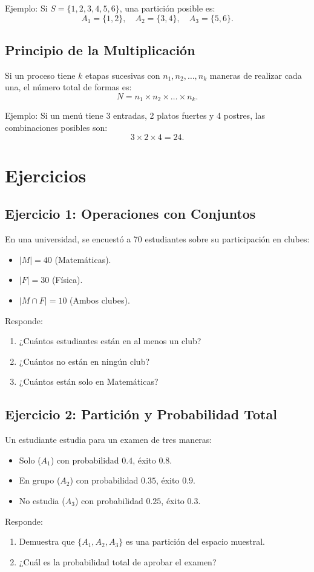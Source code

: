 \documentclass{article}
\begin{document}
	Ejemplo: Si $S = \{1,2,3,4,5,6\}$, una partición posible es:
	\[ A_1 = \{1,2\}, \quad A_2 = \{3,4\}, \quad A_3 = \{5,6\}. \]
	
	\subsection{Principio de la Multiplicación}
	Si un proceso tiene $k$ etapas sucesivas con $n_1, n_2, \dots, n_k$ maneras de realizar cada una, el número total de formas es:
	\[ N = n_1 \times n_2 \times \dots \times n_k. \]
	
	Ejemplo: Si un menú tiene 3 entradas, 2 platos fuertes y 4 postres, las combinaciones posibles son:
	\[ 3 \times 2 \times 4 = 24. \]
	
	\section{Ejercicios}
	
	\subsection{Ejercicio 1: Operaciones con Conjuntos}
	En una universidad, se encuestó a 70 estudiantes sobre su participación en clubes:
	\begin{itemize}
		\item $|M| = 40$ (Matemáticas).
		\item $|F| = 30$ (Física).
		\item $|M \cap F| = 10$ (Ambos clubes).
	\end{itemize}
	Responde:
	\begin{enumerate}
		\item ¿Cuántos estudiantes están en al menos un club?
		\item ¿Cuántos no están en ningún club?
		\item ¿Cuántos están solo en Matemáticas?
	\end{enumerate}
	
	\subsection{Ejercicio 2: Partición y Probabilidad Total}
	Un estudiante estudia para un examen de tres maneras:
	\begin{itemize}
		\item Solo ($A_1$) con probabilidad $0.4$, éxito $0.8$.
		\item En grupo ($A_2$) con probabilidad $0.35$, éxito $0.9$.
		\item No estudia ($A_3$) con probabilidad $0.25$, éxito $0.3$.
	\end{itemize}
	Responde:
	\begin{enumerate}
		\item Demuestra que $\{A_1, A_2, A_3\}$ es una partición del espacio muestral.
		\item ¿Cuál es la probabilidad total de aprobar el examen?
	\end{enumerate}
	
\end{document}
